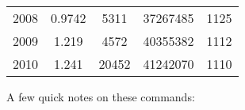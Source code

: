 \documentclass[]{book}
\theoremstyle{definition}
\theoremstyle{definition}
\theoremstyle{definition}
\theoremstyle{remark}
\begin{document}
\begin{longtable}[]{@{}ccccc@{}}
\begin{minipage}[t]{0.08\columnwidth}\centering\strut
2008\strut
\end{minipage} & \begin{minipage}[t]{0.17\columnwidth}\centering\strut
0.9742\strut
\end{minipage} & \begin{minipage}[t]{0.16\columnwidth}\centering\strut
5311\strut
\end{minipage} & \begin{minipage}[t]{0.21\columnwidth}\centering\strut
37267485\strut
\end{minipage} & \begin{minipage}[t]{0.25\columnwidth}\centering\strut
1125\strut
\end{minipage}\tabularnewline
\begin{minipage}[t]{0.08\columnwidth}\centering\strut
2009\strut
\end{minipage} & \begin{minipage}[t]{0.17\columnwidth}\centering\strut
1.219\strut
\end{minipage} & \begin{minipage}[t]{0.16\columnwidth}\centering\strut
4572\strut
\end{minipage} & \begin{minipage}[t]{0.21\columnwidth}\centering\strut
40355382\strut
\end{minipage} & \begin{minipage}[t]{0.25\columnwidth}\centering\strut
1112\strut
\end{minipage}\tabularnewline
\begin{minipage}[t]{0.08\columnwidth}\centering\strut
2010\strut
\end{minipage} & \begin{minipage}[t]{0.17\columnwidth}\centering\strut
1.241\strut
\end{minipage} & \begin{minipage}[t]{0.16\columnwidth}\centering\strut
20452\strut
\end{minipage} & \begin{minipage}[t]{0.21\columnwidth}\centering\strut
41242070\strut
\end{minipage} & \begin{minipage}[t]{0.25\columnwidth}\centering\strut
1110\strut
\end{minipage}\tabularnewline
\bottomrule
\end{longtable}

A few quick notes on these commands:
\end{document}
